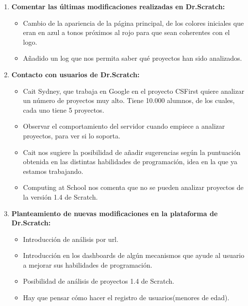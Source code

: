 \documentclass[a4paper,12pt]{letter}
\begin{document}
\begin{letter}
\begin{enumerate}
    
    \item {\textbf {Comentar las últimas modificaciones realizadas en Dr.Scratch:}}
    \begin{itemize}
        \item {Cambio de la apariencia de la página principal, de los colores
                iniciales que eran en azul a tonos próximos al rojo para que
                sean coherentes con el logo.}
        \item {Añadido un log que nos permita saber qué proyectos han sido 
                analizados.}
    \end{itemize}

    \item{\textbf {Contacto con usuarios de Dr.Scratch:}}
    \begin{itemize}
        \item {Cait Sydney, que trabaja en Google en el proyecto CSFirst quiere
                analizar un número de proyectos muy alto. Tiene 10.000 alumnos,
                de los cuales, cada uno tiene 5 proyectos.}
        \item {Observar el comportamiento del servidor cuando empiece a analizar
                proyectos, para ver si lo soporta.}
        \item {Cait nos sugiere la posibilidad de añadir sugerencias según la 
                puntuación obtenida en las distintas habilidades de 
                programación, idea en la que ya estamos trabajando.}
        \item {Computing at School nos comenta que no se pueden analizar
                proyectos de la versión 1.4 de Scratch.}

    \end{itemize}

	\item{\textbf {Planteamiento de nuevas modificaciones en la plataforma de 
                    Dr.Scratch:}}
    \begin{itemize}
        \item {Introducción de análisis por url.}
        \item {Introducción en los dashboards de algún mecanismos que ayude al 
                usuario a mejorar sus habilidades de programación.}
        \item {Posibilidad de análisis de proyectos 1.4 de Scratch.}
        \item {Hay que pensar cómo hacer el registro de usuarios(menores de edad).} 
    \end{itemize}
  

\end{enumerate}
\end{letter}
\end{document}
